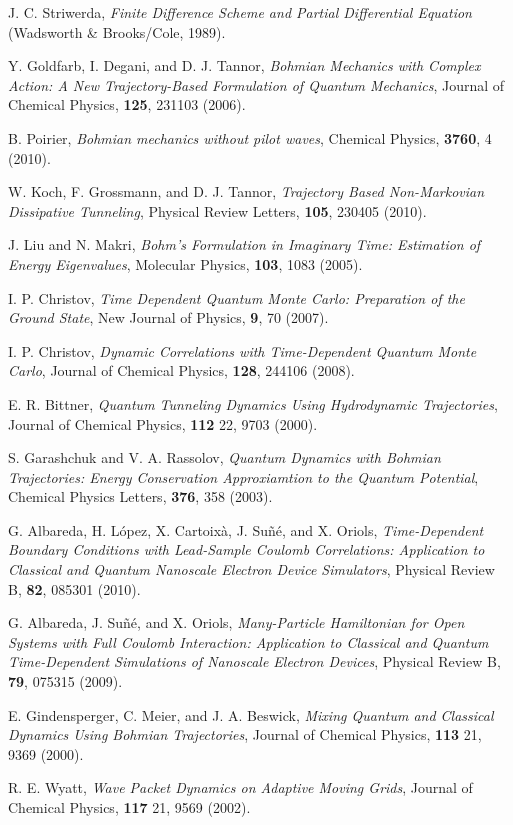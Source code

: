 \documentclass[onecolumn,nofootinbib, secnumarabic, amsmath, nobibnotes,11pt,aps,pra]{revtex4-1}
\begin{document}
\begin{thebibliography}{999}
J. C. Striwerda, \emph{Finite Difference Scheme and Partial Differential Equation} (Wadsworth \& Brooks/Cole, 1989).

Y. Goldfarb, I. Degani, and D. J. Tannor, \emph{Bohmian Mechanics with Complex Action: A New Trajectory-Based Formulation of Quantum Mechanics}, Journal of Chemical Physics, \textbf{125},  231103 (2006).

B. Poirier, \emph{Bohmian mechanics without pilot waves}, Chemical Physics, \textbf{3760}, 4 (2010).

W. Koch, F. Grossmann, and D. J. Tannor, \emph{Trajectory Based Non-Markovian Dissipative Tunneling}, Physical Review Letters, \textbf{105},  230405 (2010).

J. Liu and N. Makri, \emph{Bohm's Formulation in Imaginary Time: Estimation of Energy Eigenvalues}, Molecular Physics, \textbf{103},  1083 (2005).

I. P. Christov, \emph{Time Dependent Quantum Monte Carlo: Preparation of the Ground State}, New Journal of Physics, \textbf{9},  70 (2007).

I. P. Christov, \emph{Dynamic Correlations with Time-Dependent Quantum Monte Carlo}, Journal of Chemical Physics, \textbf{128},  244106 (2008).

E. R. Bittner, \emph{Quantum Tunneling Dynamics Using Hydrodynamic Trajectories}, Journal of Chemical Physics, \textbf{112} 22,  9703 (2000).

S. Garashchuk and V. A. Rassolov, \emph{Quantum Dynamics with Bohmian Trajectories: Energy Conservation Approxiamtion to the Quantum Potential}, Chemical Physics Letters, \textbf{376},  358 (2003).

G. Albareda, H. L\'{o}pez, X. Cartoix\`{a}, J.  Su\~{n}\'{e}, and X.
Oriols, \emph{Time-Dependent Boundary Conditions with Lead-Sample
Coulomb  Correlations: Application to Classical and Quantum
Nanoscale Electron Device Simulators}, Physical Review B,
\textbf{82},  085301 (2010).

G. Albareda, J. Su\~{n}\'{e}, and X. Oriols, \emph{Many-Particle Hamiltonian for Open Systems with Full Coulomb Interaction: Application to Classical and Quantum Time-Dependent Simulations of Nanoscale Electron Devices}, Physical Review B, \textbf{79},  075315 (2009).

E. Gindensperger, C. Meier, and J. A. Beswick, \emph{Mixing Quantum and Classical Dynamics Using Bohmian Trajectories}, Journal of Chemical Physics, \textbf{113} 21,  9369 (2000).

R. E. Wyatt, \emph{Wave Packet Dynamics on Adaptive Moving Grids}, Journal of Chemical Physics, \textbf{117} 21,  9569 (2002).

\end{thebibliography}
\end{document}
